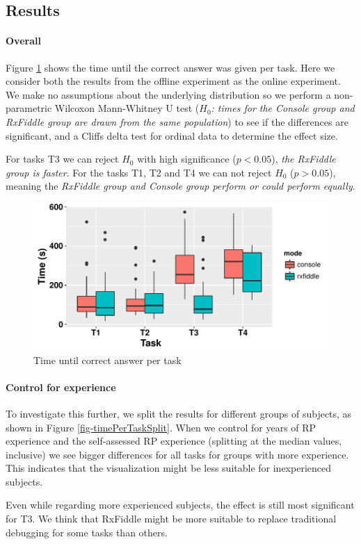 \subsection{Results}
\paragraph{Overall}
Figure \ref{fig-timePerTask} shows the time until the correct answer was given per task. Here we consider both the results from the offline experiment as the online experiment. We make no assumptions about the underlying distribution so we perform a non-parametric Wilcoxon Mann-Whitney U test (\textit{$H_0$: times for the Console group and RxFiddle group are drawn from the same population}) to see if the differences are significant, and a Cliffs delta test for ordinal data to determine the effect size.

\begin{centering}

\end{centering}

For tasks T3 we can reject $H_0$ with high significance ($p < 0.05$), \emph{the RxFiddle group is faster}.
For the tasks T1, T2 and T4 we can not reject $H_0$ ($p > 0.05$), meaning the \emph{RxFiddle group and Console group perform or could perform equally}.

\begin{figure}[t]
\includegraphics[width=\columnwidth]{images/timePerTask.pdf}
\caption{Time until correct answer per task}
\label{fig-timePerTask}
\end{figure}

\paragraph{Control for experience}
To investigate this further, we split the results for different groups of subjects, as shown in Figure \ref{fig-timePerTaskSplit}.  When we control for years of RP experience and the self-assessed RP experience (splitting at the median values, inclusive) we see bigger differences for all tasks for groups with more experience. This indicates that the visualization might be less suitable for inexperienced subjects.

Even while regarding more experienced subjects, the effect is still most significant for T3. We think that RxFiddle might be more suitable to replace traditional debugging for some tasks than others.
